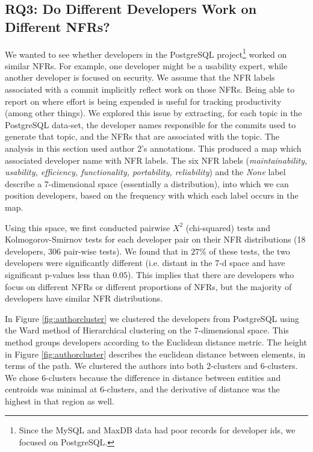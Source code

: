 \documentclass[smallextended]{svjour3}       %
\begin{document}

\subsection{RQ3: Do Different Developers Work on Different NFRs?}

\label{sec:developers}


We wanted to see whether developers in the PostgreSQL project\footnote{Since the MySQL and MaxDB data had poor records for developer ids, we focused on PostgreSQL.} worked on similar NFRs. For example, one developer might be a usability expert, while
another developer is focused on security. We assume that the NFR labels associated with a commit implicitly reflect work on those NFRs. Being able to report on where effort is being expended is useful for tracking productivity (among other things).
We explored this issue by extracting, for each topic in the PostgreSQL data-set, the developer names responsible for the commits used to generate that topic, and 
the NFRs that are associated with the topic. 
The analysis in this section used author 2's annotations.
This produced a map which associated developer name with NFR
labels. The six NFR labels (\emph{maintainability, usability,
  efficiency, functionality, portability, reliability}) and the
\emph{None} label describe a 7-dimensional space (essentially a distribution), into which we can position developers, based on the frequency with which each label occurs in the map.

Using this space, we first conducted pairwise $X^2$ (chi-squared)
tests and Kolmogorov-Smirnov tests for each developer 
 pair on their
NFR distributions
(18 developers, 306 pair-wise tests).
We
found that in $27\%$ of these tests, the two developers were significantly
different (i.e. distant in the 7-d space and have significant p-values less than $0.05$). This implies
that there are developers who focus on different NFRs or different
proportions of NFRs, but the majority of developers have similar NFR distributions.

In Figure \ref{fig:authorcluster} we clustered the developers from
PostgreSQL using the
Ward method of Hierarchical clustering on the 7-dimensional space.  
This method groups developers according to the Euclidean distance metric.
The height in Figure \ref{fig:authorcluster} describes the euclidean
distance between elements, in terms of the path. 
We clustered the authors into both $2$-clusters
and $6$-clusters. We chose $6$-clusters because the difference in distance
between entities and centroids was minimal at $6$-clusters, and the
derivative of distance was the highest in that region as well.
\end{document}

